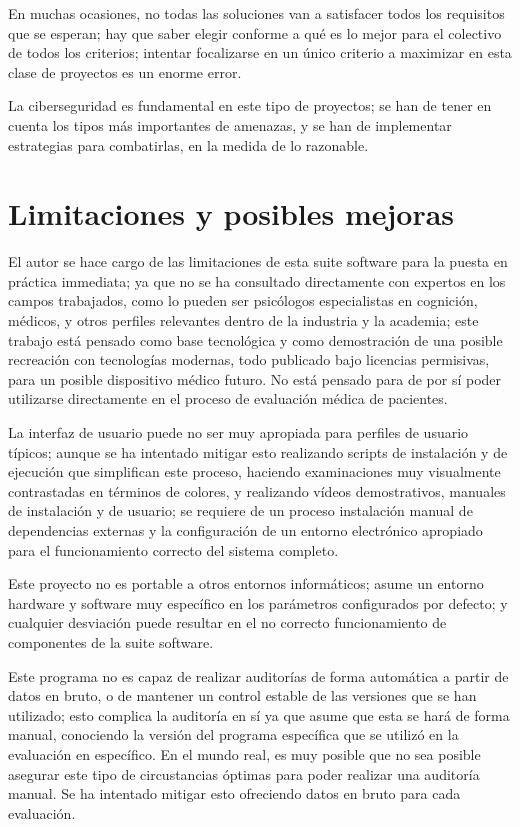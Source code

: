 \documentclass[12pt,a4paper,twoside,openright]{book}
\begin{document}
En muchas ocasiones, no todas las soluciones van a satisfacer todos los requisitos que se esperan; hay que saber elegir conforme a qué es lo mejor para el colectivo de todos los criterios; intentar focalizarse en un único criterio a maximizar en esta clase de proyectos es un enorme error.

La ciberseguridad es fundamental en este tipo de proyectos; se han de tener en cuenta los tipos más importantes de amenazas, y se han de implementar estrategias para combatirlas, en la medida de lo razonable.

\section{Limitaciones y posibles mejoras}

El autor se hace cargo de las limitaciones de esta suite software para la puesta en práctica immediata; ya que no se ha consultado directamente con expertos en los campos trabajados, como lo pueden ser psicólogos especialistas en cognición, médicos, y otros perfiles relevantes dentro de la industria y la academia; este trabajo está pensado como base tecnológica y como demostración de una posible recreación con tecnologías modernas, todo publicado bajo licencias permisivas, para un posible dispositivo médico futuro. No está pensado para de por sí poder utilizarse directamente en el proceso de evaluación médica de pacientes.

La interfaz de usuario puede no ser muy apropiada para perfiles de usuario típicos; aunque se ha intentado mitigar esto realizando scripts de instalación y de ejecución que simplifican este proceso, haciendo examinaciones muy visualmente contrastadas en términos de colores, y realizando vídeos demostrativos, manuales de instalación y de usuario; se requiere de un proceso instalación manual de dependencias externas y la configuración de un entorno electrónico apropiado para el funcionamiento correcto del sistema completo.

Este proyecto no es portable a otros entornos informáticos; asume un entorno hardware y software muy específico en los parámetros configurados por defecto; y cualquier desviación puede resultar en el no correcto funcionamiento de componentes de la suite software.

Este programa no es capaz de realizar auditorías de forma automática a partir de datos en bruto, o de mantener un control estable de las versiones que se han utilizado; esto complica la auditoría en sí ya que asume que esta se hará de forma manual, conociendo la versión del programa específica que se utilizó en la evaluación en específico. En el mundo real, es muy posible que no sea posible asegurar este tipo de circustancias óptimas para poder realizar una auditoría manual. Se ha intentado mitigar esto ofreciendo datos en bruto para cada evaluación.
\end{document}
